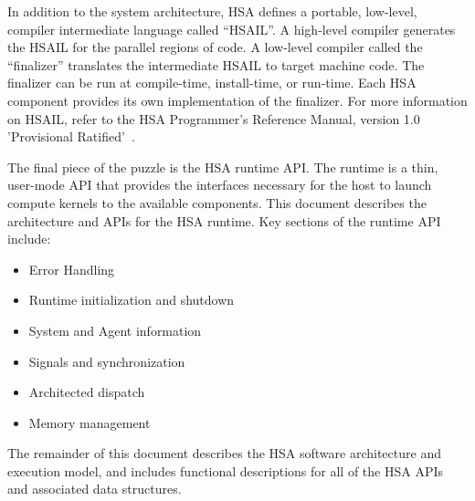 \documentclass[final]{book}
\begin{document}
In addition to the system architecture, HSA defines a portable, low-level,
compiler intermediate language called ``HSAIL''.  A high-level compiler
generates the HSAIL for the parallel regions of code. A low-level compiler
called the ``finalizer'' translates the intermediate HSAIL to target machine
code. The finalizer can be run at compile-time, install-time, or run-time. Each
HSA component provides its own implementation of the finalizer.  For more
information on HSAIL, refer to the HSA Programmer's Reference Manual, version
1.0 'Provisional Ratified'~\cite{prm}.

The final piece of the puzzle is the HSA runtime API.  The runtime is a thin,
user-mode API that provides the interfaces necessary for the host to launch
compute kernels to the available components. This document describes the
architecture and APIs for the HSA runtime. Key sections of the runtime API
include:
\begin{itemize}
\item Error Handling
\item Runtime initialization and shutdown
\item System and Agent information
\item Signals and synchronization
\item Architected dispatch
\item Memory management
\end{itemize}

The remainder of this document describes the HSA software architecture and
execution model, and includes functional descriptions for all of the HSA APIs
and associated data structures.
\end{document}
